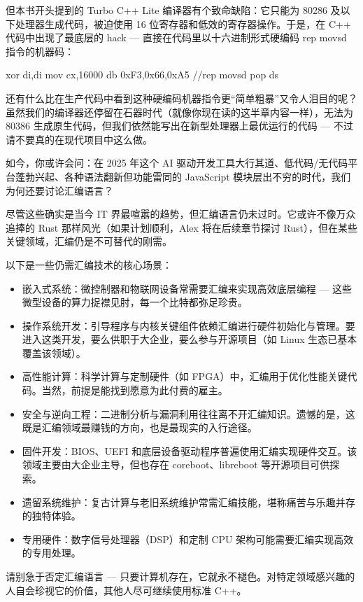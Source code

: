 但本书开头提到的 Turbo C++ Lite 编译器有个致命缺陷：它只能为 80286 及以下处理器生成代码，被迫使用 16 位寄存器和低效的寄存器操作。于是，在 C++ 代码中出现了最底层的 hack --- 直接在代码里以十六进制形式硬编码 rep movsd 指令的机器码：

\begin{shell}
xor di,di
mov cx,16000
db 0xF3,0x66,0xA5 //rep movsd
pop ds
\end{shell}

还有什么比在生产代码中看到这种硬编码机器指令更“简单粗暴”又令人泪目的呢？虽然我们的编译器还停留在石器时代（就像你现在读的这半章内容一样），无法为 80386 生成原生代码，但我们依然能写出在新型处理器上最优运行的代码 --- 不过请不要真的在现代项目中这么做。


如今，你或许会问：在 2025 年这个 AI 驱动开发工具大行其道、低代码/无代码平台蓬勃兴起、各种语法翻新但功能雷同的 JavaScript 模块层出不穷的时代，我们为何还要讨论汇编语言？

尽管这些确实是当今 IT 界最喧嚣的趋势，但汇编语言仍未过时。它或许不像万众追捧的 Rust 那样风光（如果计划顺利，Alex 将在后续章节探讨 Rust），但在某些关键领域，汇编仍是不可替代的刚需。

以下是一些仍需汇编技术的核心场景：

\begin{itemize}
\item 
嵌入式系统：微控制器和物联网设备常需要汇编来实现高效底层编程 --- 这些微型设备的算力捉襟见肘，每一个比特都弥足珍贵。

\item 
操作系统开发：引导程序与内核关键组件依赖汇编进行硬件初始化与管理。要进入这类开发，要么供职于大企业，要么参与开源项目（如 Linux 生态已基本覆盖该领域）。

\item 
高性能计算：科学计算与定制硬件（如 FPGA）中，汇编用于优化性能关键代码。当然，前提是能找到愿意为此付费的雇主。

\item 
安全与逆向工程：二进制分析与漏洞利用往往离不开汇编知识。遗憾的是，这既是汇编领域最赚钱的方向，也是最现实的入行途径。

\item 
固件开发：BIOS、UEFI 和底层设备驱动程序普遍使用汇编实现硬件交互。该领域主要由大企业主导，但也存在 coreboot、libreboot 等开源项目可供探索。

\item 
遗留系统维护：复古计算与老旧系统维护常需汇编技能，堪称痛苦与乐趣并存的独特体验。

\item 
专用硬件：数字信号处理器（DSP）和定制 CPU 架构可能需要汇编实现高效的专用处理。
\end{itemize}

请别急于否定汇编语言 --- 只要计算机存在，它就永不褪色。对特定领域感兴趣的人自会珍视它的价值，其他人尽可继续使用标准 C++。

